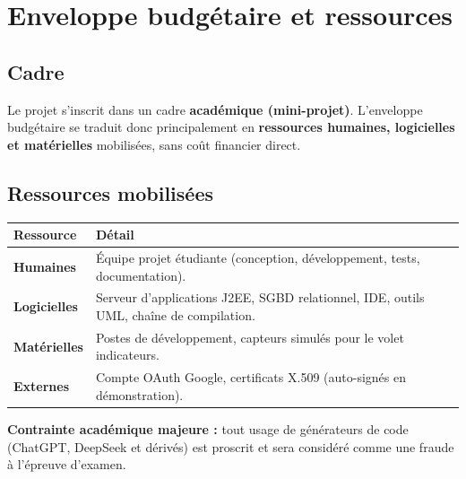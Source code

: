 \chapter{Enveloppe budgétaire et ressources}

\section{Cadre}
Le projet s'inscrit dans un cadre \textbf{académique (mini-projet)}. L'enveloppe
budgétaire se traduit donc principalement en \textbf{ressources humaines,
logicielles et matérielles} mobilisées, sans coût financier direct.

\section{Ressources mobilisées}
\begin{xltabular}{\textwidth}{>{\bfseries}p{4cm} X}
\toprule
\textbf{Ressource} & \textbf{Détail} \\
\midrule
\endhead
Humaines   & Équipe projet étudiante (conception, développement, tests, documentation). \\
Logicielles & Serveur d'applications J2EE, SGBD relationnel, IDE, outils UML, chaîne de compilation. \\
Matérielles & Postes de développement, capteurs simulés pour le volet indicateurs. \\
Externes   & Compte OAuth Google, certificats X.509 (auto-signés en démonstration). \\
\bottomrule
\end{xltabular}

\begin{encadre}
\textbf{Contrainte académique majeure :} tout usage de générateurs de code
(ChatGPT, DeepSeek et dérivés) est proscrit et sera considéré comme une fraude
à l'épreuve d'examen.
\end{encadre}

